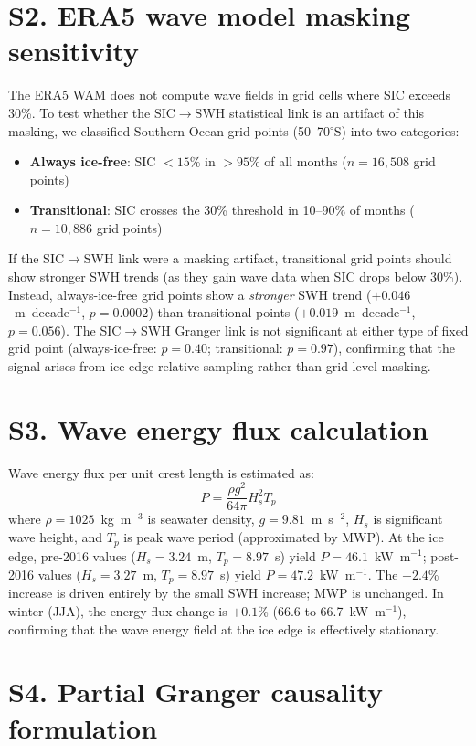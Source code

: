\documentclass[11pt]{article}
\begin{document}
\section*{S2. ERA5 wave model masking sensitivity}

The ERA5 WAM does not compute wave fields in grid cells where SIC exceeds 30\%. To test whether the SIC$\to$SWH statistical link is an artifact of this masking, we classified Southern Ocean grid points (50--70$^\circ$S) into two categories:

\begin{itemize}
\item \textbf{Always ice-free}: SIC $< 15$\% in $> 95$\% of all months ($n = 16{,}508$ grid points)
\item \textbf{Transitional}: SIC crosses the 30\% threshold in 10--90\% of months ($n = 10{,}886$ grid points)
\end{itemize}

If the SIC$\to$SWH link were a masking artifact, transitional grid points should show stronger SWH trends (as they gain wave data when SIC drops below 30\%). Instead, always-ice-free grid points show a \textit{stronger} SWH trend ($+0.046$~m~decade$^{-1}$, $p = 0.0002$) than transitional points ($+0.019$~m~decade$^{-1}$, $p = 0.056$). The SIC$\to$SWH Granger link is not significant at either type of fixed grid point (always-ice-free: $p = 0.40$; transitional: $p = 0.97$), confirming that the signal arises from ice-edge-relative sampling rather than grid-level masking.

\section*{S3. Wave energy flux calculation}

Wave energy flux per unit crest length is estimated as:
\[
P = \frac{\rho g^2}{64\pi} H_s^2 T_p
\]
where $\rho = 1025$~kg~m$^{-3}$ is seawater density, $g = 9.81$~m~s$^{-2}$, $H_s$ is significant wave height, and $T_p$ is peak wave period (approximated by MWP). At the ice edge, pre-2016 values ($H_s = 3.24$~m, $T_p = 8.97$~s) yield $P = 46.1$~kW~m$^{-1}$; post-2016 values ($H_s = 3.27$~m, $T_p = 8.97$~s) yield $P = 47.2$~kW~m$^{-1}$. The $+2.4$\% increase is driven entirely by the small SWH increase; MWP is unchanged. In winter (JJA), the energy flux change is $+0.1$\% (66.6 to 66.7~kW~m$^{-1}$), confirming that the wave energy field at the ice edge is effectively stationary.

\section*{S4. Partial Granger causality formulation}
\end{document}

